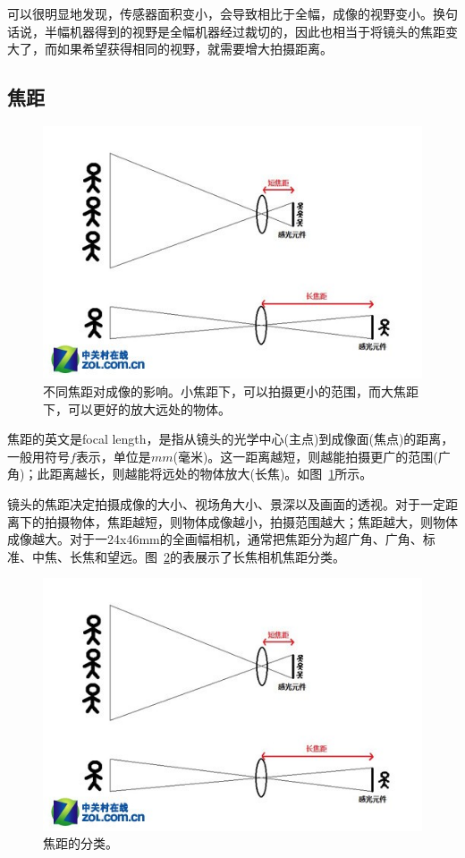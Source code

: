 \documentclass{ctexart}
\begin{document}
可以很明显地发现，传感器面积变小，会导致相比于全幅，成像的视野变小。换句话说，半幅机器得到的视野是全幅机器经过裁切的，因此也相当于将镜头的焦距变大了，而如果希望获得相同的视野，就需要增大拍摄距离。

\subsection{焦距~\cite{focal_length_shutter_etc}}
\begin{figure}[h!]
    \centering
    \includegraphics[width=.8\linewidth]{imgs/focal_length.jpg}
    \caption{不同焦距对成像的影响。小焦距下，可以拍摄更小的范围，而大焦距下，可以更好的放大远处的物体。}
    \label{fig_focal_length}
\end{figure}
焦距的英文是focal length，是指从镜头的光学中心(主点)到成像面(焦点)的距离，一般用符号$f$表示，单位是$mm$(毫米)。这一距离越短，则越能拍摄更广的范围(广角)；此距离越长，则越能将远处的物体放大(长焦)。如图~\ref{fig_focal_length}所示。

镜头的焦距决定拍摄成像的大小、视场角大小、景深以及画面的透视。对于一定距离下的拍摄物体，焦距越短，则物体成像越小，拍摄范围越大；焦距越大，则物体成像越大。对于一24x46mm的全画幅相机，通常把焦距分为超广角、广角、标准、中焦、长焦和望远。图~\ref{fig_focal_length_category}的表展示了长焦相机焦距分类。
\begin{figure}[h!]
    \centering
    \includegraphics[width=.8\linewidth]{imgs/focal_length.jpg}
    \caption{焦距的分类。}
    \label{fig_focal_length_category}
\end{figure}
\end{document}
